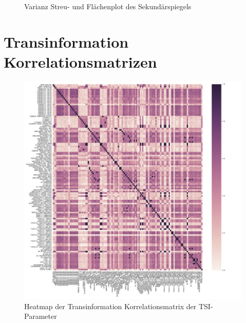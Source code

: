 \begin{appendix}
\begin{figure}[H]
	\caption[Varianz Streu- und Flächenplot des Sekundärspiegels]{Varianz Streu- und Flächenplot des Sekundärspiegels}
    \label{foc_var}
\end{figure}

\section{Transinformation Korrelationsmatrizen}

\begin{figure}[H]
	\centering
	\includegraphics[scale=.44]{heatmaps/tsi.pdf}
	\caption[Heatmap der Transinformation Korrelationsmatrix der TSI-Parameter]{Heatmap der Transinformation Korrelationsmatrix der TSI-Parameter}
    \label{heatmap_tsi}
\end{figure}
\begin{figure}[H]
	\centering

\end{figure}
\end{appendix}
